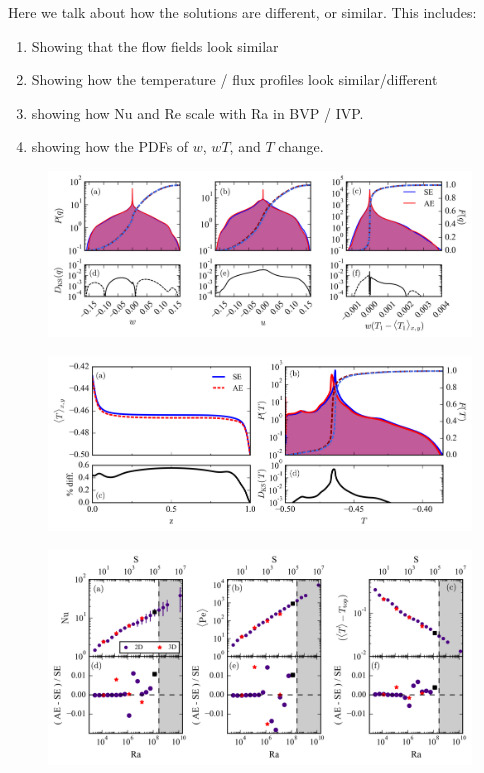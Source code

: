\documentclass[aps, pre, onecolumn, nofootinbib, notitlepage, groupedaddress, amsfonts, amssymb, amsmath, longbibliography]{revtex4-1}
\begin{document}
Here we talk about how the solutions are different, or similar.  This includes:
\begin{enumerate}
\item Showing that the flow fields look similar
\item Showing how the temperature / flux profiles look similar/different
\item showing how Nu and Re scale with Ra in BVP / IVP.
\item showing how the PDFs of $w$, $wT$, and $T$ change.
\end{enumerate}

\begin{figure}[t]
\includegraphics[width=\textwidth]{./figs/pdf_comparison.png}
\caption{\label{fig:pdf_comparison} }
\end{figure}

\begin{figure}[t]
\includegraphics[width=\textwidth]{./figs/temp_comparison.png}
\caption{\label{fig:temp_comparison} }
\end{figure}

\begin{figure}[t]
\includegraphics[width=\textwidth]{./figs/parameter_space_comparison.png}
\caption{\label{fig:parameter_space_comparison} }
\end{figure}
\end{document}

